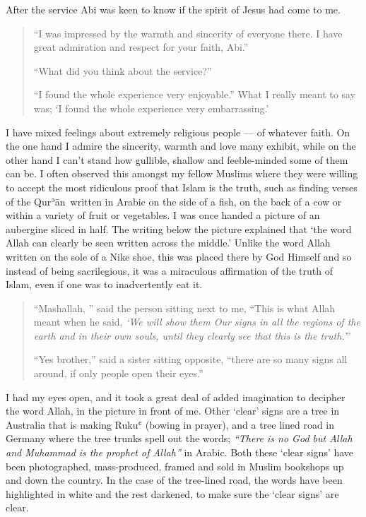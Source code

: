 \documentclass[12pt]{memoir}
\def\´{ʾ} %
\def\`{ʿ} %
\def \Quran{Qur\-\´ān} %
\def\–{-\hskip0pt}
\begin{document}
After the service Abi was keen to know if the spirit of Jesus had come to me.

\begin{quote}
“I was impressed by the warmth and sincerity of everyone there.
I have great admiration and respect for your faith, Abi.”

“What did you think about the service?”

“I found the whole experience very enjoyable.”
What I really meant to say was;
‘I found the whole experience very embarrassing.’
\end{quote}

I have mixed feelings about extremely religious people — of whatever faith.
On the one hand I admire the sincerity, warmth and love many exhibit,
while on the other hand I can’t stand how gullible,
shallow and feeble\–minded some of them can be.
I often observed this amongst my fellow Muslims where they were willing
to accept the most ridiculous proof that Islam is the truth,
such as finding verses of the \Quran\ written in Arabic on the side of a fish,
on the back of a cow or within a variety of fruit or vegetables.
I was once handed a picture of an aubergine sliced in half.
The writing below the picture explained that
‘the word Allah can clearly be seen written across the middle.’
Unlike the word Allah written on the sole of a Nike shoe,
this was placed there by God Himself and so instead of being sacrilegious,
it was a miraculous affirmation of the truth of Islam,
even if one was to inadvertently eat it.

\begin{quote}
“Mashallah, ” said the person sitting next to me,
“This is what Allah meant when he said,
\emph{‘We will show them Our signs in all the regions of the earth
and in their own souls, until they clearly see that this is the truth.’}”

“Yes brother,” said a sister sitting opposite,
“there are so many signs all around, if only people open their eyes.”
\end{quote}

I had my eyes open, and it took a great deal of added imagination
to decipher the word Allah, in the picture in front of me.
Other ‘clear’ signs are a tree in Australia that is making Ruku\`
(bowing in prayer), and a tree lined road in Germany
where the tree trunks spell out the words;
\emph{“There is no God but Allah and Muhammad is the prophet of Allah”}
in Arabic.
Both these ‘clear signs’ have been photographed, mass\–produced,
framed and sold in Muslim bookshops up and down the country.
In the case of the tree\–lined road, the words have been highlighted
in white and the rest darkened, to make sure the ‘clear signs’ are clear.
\end{document}
